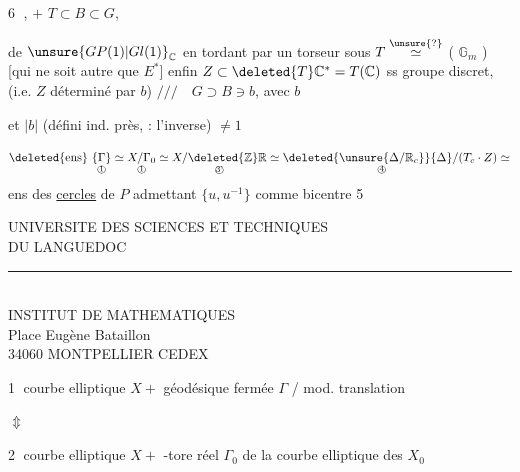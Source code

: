 \textcircled{6} , $+$    $T\subset B\subset G$,  


de $\unsure{GP(1)|Gl(1)}_{\mathbb C}$ en tordant par un torseur sous $T\overset{\unsure{\mathrm{?}}}{\simeq}$ ( $\mathbb G_m$ )  [qui ne soit autre que $E^*$] enfin $Z\subset\deleted{T}\mathbb C^*=T(\mathbb C)$ ss groupe discret, (i.e. $Z$ déterminé par $b$) \quad $///\quad G\supset B\ni b$, avec $b$ 

et $|b|$ (défini ind. près,  : l'inverse) $\ne1$

\[
\deleted{\text{ens}}\ \underset{\text{\textcircled{1}}}{\{\Gamma\}}
\simeq\underset{\text{\textcircled{1}}}{X/\Gamma_0}
\simeq\underset{\text{\textcircled{3'}}}{X/\deleted{\mathbb Z}\mathbb R}
\simeq\deleted{\underset{\text{\textcircled{4}}}{\unsure{\Delta/\mathbb R_c}}}
{\Delta}/{(T_c\cdot Z)}
\simeq
\]
ens des \uline{cercles} de $P$  admettant $\{u,u^{-1}\}$ comme bicentre \textcircled{5}

\begin{center}
UNIVERSITE DES SCIENCES ET TECHNIQUES\\
DU LANGUEDOC\\
\rule{1cm}{0.2pt}\\
INSTITUT DE MATHEMATIQUES\\
Place Eugène Bataillon\\
34060 MONTPELLIER CEDEX
\end{center}



\textcircled{1} courbe elliptique $X+$ géodésique fermée $\Gamma$ / mod. translation

$\Updownarrow$

\textcircled{2} courbe elliptique $X+$   -tore réel $\Gamma_0$ de la courbe elliptique des $X_0$ 

